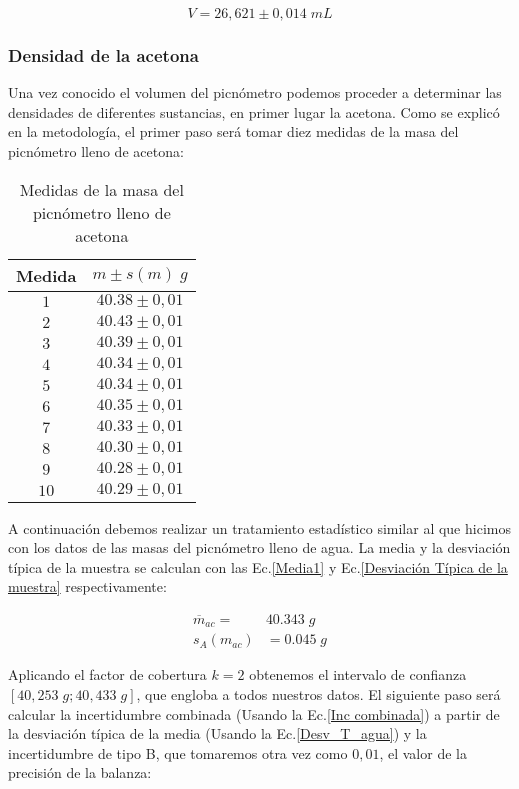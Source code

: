 \documentclass[a4paper,12pt,titlepage]{article}
\begin{document}
\begin{equation}
    V = 26,621 \pm 0,014 \; mL
\end{equation}

\subsubsection{Densidad de la acetona}

Una vez conocido el volumen del picnómetro podemos proceder a determinar las densidades de diferentes sustancias, en primer lugar la acetona. Como se explicó en la metodología, el primer paso será tomar diez medidas de la masa del picnómetro lleno de acetona:

\begin{table}[h!]
    \centering
    \begin{tabular}{|c|c|}
    \hline
    Medida & $m \pm s(m) \; g$\\ \hline
    $1$    & $40.38\pm 0,01$ \\ \hline
    $2$    & $40.43\pm 0,01$ \\ \hline
    $3$    & $40.39\pm 0,01$ \\ \hline
    $4$    & $40.34\pm 0,01$ \\ \hline
    $5$    & $40.34\pm 0,01$ \\ \hline
    $6$    & $40.35\pm 0,01$ \\ \hline
    $7$    & $40.33\pm 0,01$ \\ \hline
    $8$    & $40.30\pm 0,01$ \\ \hline
    $9$    & $40.28\pm 0,01$ \\ \hline
    $10$   & $40.29\pm 0,01$ \\ \hline
    \end{tabular}
    \caption{Medidas de la masa del picnómetro lleno de acetona}
    \label{Masas Acetona}
    \end{table}

A continuación debemos realizar un tratamiento estadístico similar al que hicimos con los datos de las masas del picnómetro lleno de agua. La media y la desviación típica de la muestra se calculan con las Ec.\ref{Media1} y Ec.\ref{Desviación Típica de la muestra} respectivamente:

\begin{align}
    \overline{m}_{ac} = &40.343 \; g    \\
    s_{A}(m_{ac}) &= 0.045 \; g
\end{align}

Aplicando el factor de cobertura $k=2$ obtenemos el intervalo de confianza $[40,253 \; g ; 40,433 \; g]$, que engloba a todos nuestros datos. El siguiente paso será calcular la incertidumbre combinada (Usando la Ec.\ref{Inc combinada}) a partir de la desviación típica de la media (Usando la Ec.\ref{Desv_T_agua}) y la incertidumbre de tipo B, que tomaremos otra vez como $0,01$, el valor de la precisión de la balanza:
\end{document}
